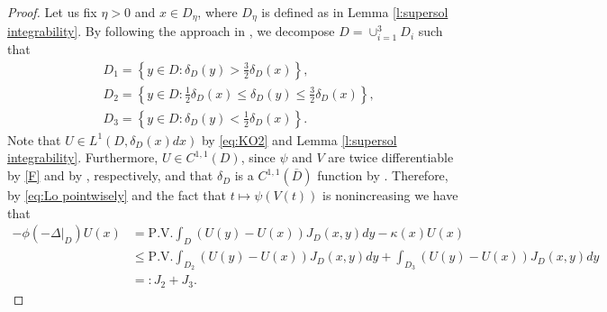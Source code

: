 \documentclass[12pt,a4paper,onecolumn]{amsart}
\theoremstyle{definition}
\newcommand{\1}{\mathbf 1}
\newcommand{\LLL}{L^1(D,\de(x)dx)}
\newcommand{\Lo}{\phi(-\left.\Delta\right\vert_{D})}
\newcommand{\de}{\delta_D}
\numberwithin{equation}{section}
\begin{document}
\begin{proof}
     Let us fix $\eta>0$ and $x\in D_{\eta}$, where $D_{\eta}$ is defined as in Lemma \ref{l:supersol integrability}.  By following the approach in \cite[Proposition 3.2]{semilinear_cvw}, we decompose $D=\cup_{i=1}^3D_i$ such that
\begin{align*}
&D_1=\left\{y\in D: \delta_D(y)>\tfrac{3}{2}\delta_D(x)\right\},\\
&D_2=\left\{y\in D: \tfrac{1}{2}\delta_D(x)\leq\delta_D(y)\leq\tfrac{3}{2}\delta_D(x)\right\},\\
&D_3=\left\{y\in D: \delta_D(y)<\tfrac{1}{2}\delta_D(x)\right\}.
\end{align*}
Note that $U\in\LLL$ by \eqref{eq:KO2} and Lemma \ref{l:supersol integrability}. Furthermore, $U\in C^{1,1}(D)$, since $\psi$ and $V$ are twice differentiable by \ref{F} and by \cite[Lemma 2.5]{KKLL}, respectively, and that $\de$ is a $C^{1,1}(\overline D)$ function by \cite[Theorem 8.4 in Chapter 7]{DZ}. Therefore, by \eqref{eq:Lo pointwisely} and the fact that $t\mapsto\psi(V(t))$ is nonincreasing we have that
\begin{align*}
-\Lo U(x)&=\textrm{P.V.}\int_D (U(y)-U(x))J_D(x,y) dy -\kappa(x)U(x)\\
&\le \textrm{P.V.}\int_{D_2} (U(y)-U(x))J_D(x,y) dy+\int_{D_3} (U(y)-U(x))J_D(x,y) dy\\
&=:J_2+J_3.
\end{align*}



\end{proof}
\end{document}

